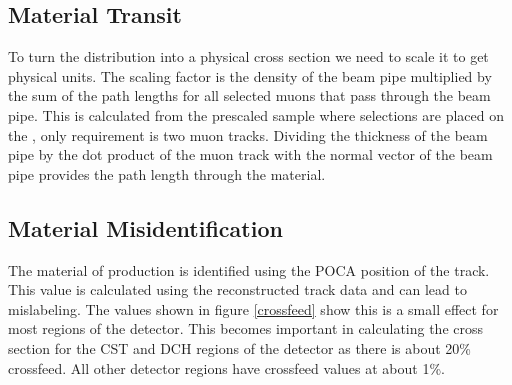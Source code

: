 \subsection{Material Transit}
	To turn the \deltaray distribution into a physical cross section we need to scale it to get physical units. The scaling factor is the density of the beam pipe multiplied by the sum of the path lengths for all selected muons that pass through the beam pipe. This is calculated from the prescaled sample where selections are placed on the \deltarays, only requirement is two muon tracks. Dividing the thickness of the beam pipe by the dot product of the muon track with the normal vector of the beam pipe provides the path length through the material.
\subsection{Material Misidentification}
	The material of \deltaray production is identified using the POCA position of the \deltaray track. This value is calculated using the reconstructed track data and can lead to mislabeling. The values shown in figure \ref{crossfeed} show this is a small effect for most regions of the detector. This becomes important in calculating the cross section for the CST and DCH regions of the detector as there is about 20\% crossfeed. All other detector regions have crossfeed values at about 1\%.
